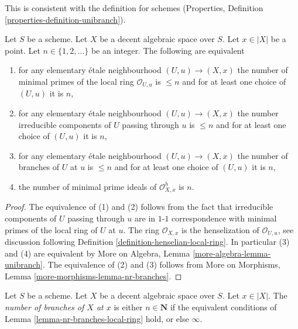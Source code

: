 \noindent
This is consistent with the definition for schemes
(Properties, Definition \ref{properties-definition-unibranch}).

\begin{lemma}
\label{lemma-nr-branches-local-ring}
Let $S$ be a scheme. Let $X$ be a decent algebraic space over $S$.
Let $x \in |X|$ be a point. Let $n \in \{1, 2, \ldots\}$ be an integer.
The following are equivalent
\begin{enumerate}
\item for any elementary \'etale neighbourhood $(U, u) \to (X, x)$
the number of minimal primes of the local ring $\mathcal{O}_{U, u}$
is $\leq n$ and for at least one choice of $(U, u)$ it is $n$,
\item for any elementary \'etale neighbourhood $(U, u) \to (X, x)$
the number irreducible components of $U$ passing through $u$ is $\leq n$
and for at least one choice of $(U, u)$ it is $n$,
\item for any elementary \'etale neighbourhood $(U, u) \to (X, x)$
the number of branches of $U$ at $u$ is $\leq n$
and for at least one choice of $(U, u)$ it is $n$,
\item the number of minimal prime ideals of
$\mathcal{O}_{X, x}^h$ is $n$.
\end{enumerate}
\end{lemma}

\begin{proof}
The equivalence of (1) and (2) follows from the fact that irreducible
components of $U$ passing through $u$ are in $1$-$1$ correspondence with
minimal primes of the local ring of $U$ at $u$.
The ring $\mathcal{O}_{X, x}$ is the henselization of $\mathcal{O}_{U, u}$, see
discussion following Definition \ref{definition-henselian-local-ring}.
In particular (3) and (4) are equivalent by
More on Algebra, Lemma \ref{more-algebra-lemma-unibranch}.
The equivalence of (2) and (3) follows from
More on Morphisms, Lemma \ref{more-morphisms-lemma-nr-branches}.
\end{proof}

\begin{definition}
\label{definition-number-of-branches}
Let $S$ be a scheme. Let $X$ be a decent algebraic space over $S$.
Let $x \in |X|$. The {\it number of branches of $X$ at $x$} is
either $n \in \mathbf{N}$ if the equivalent conditions
of Lemma \ref{lemma-nr-branches-local-ring}
hold, or else $\infty$.
\end{definition}






